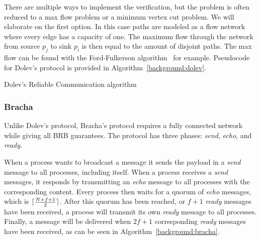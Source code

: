 There are multiple ways to implement the verification, but the problem is often reduced to a max flow problem or a minimum vertex cut problem. We will elaborate on the first option. In this case paths are modeled as a flow network where every edge has a capacity of one. The maximum flow through the network from source $p_j$ to sink $p_i$ is then equal to the amount of disjoint paths. The max flow can be found with the Ford-Fulkerson algorithm~\cite{ford_fulkerson} for example.
Pseudocode for Dolev's protocol is provided in Algorithm~\ref{background:dolev}.

\begin{algorithm}
  \DontPrintSemicolon
  
  
 \caption{Dolev's Reliable Communication algorithm}
 \label{background:dolev}
\end{algorithm}

\subsubsection{Bracha}
Unlike Dolev's protocol, Bracha's protocol requires a fully connected network while giving all BRB guarantees. The protocol has three phases: \textit{send}, \textit{echo}, and \textit{ready}.

When a process wants to broadcast a message it sends the payload in a \textit{send} message to all processes, including itself. When a process receives a \textit{send} messages, it responds by transmitting an \textit{echo} message to all processes with the corresponding content. Every process then waits for a quorum of \textit{echo} messages, which is $\lceil\frac{N+f+1}{2}\rceil$. 
After this quorum has been reached, or $f+1$ \textit{ready} messages have been received, a process will transmit its own \textit{ready} message to all processes. Finally, a message will be delivered when $2f+1$ corresponding \textit{ready} messages have been received, as can be seen in Algorithm~\ref{background:bracha}.


